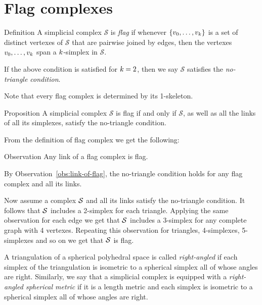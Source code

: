\section{Flag complexes}


\begin{thm}{Definition}
A simplicial complex $\mathcal{S}$ 
is \emph{flag} if whenever $\{v_0,\z\dots,v_\kay\}$
is a set of distinct vertexes of $\mathcal{S}$
that are pairwise joined by edges, then the vertexes $v_0,\dots,v_\kay$
span a $k$-simplex in $\mathcal{S}$.

If the above condition is satisfied for $k=2$, 
then we say $\mathcal{S}$ satisfies 
the \emph{no-triangle condition}.
\end{thm}

Note that every flag complex is determined by its 1-skeleton.

\begin{thm}{Proposition}\label{prop:no-trig}
A simplicial complex $\mathcal{S}$ is flag if and only if 
$\mathcal{S}$, as well as all the links of all its simplexes,
satisfy the no-triangle condition.
\end{thm}

From the definition of flag complex 
we get the following:

\begin{thm}{Observation}\label{obs:link-of-flag}
Any link of a flag complex is flag.
\end{thm}


By Observation~\ref{obs:link-of-flag}, the no-triangle condition holds 
for any flag complex and all its links.

Now assume a complex $\mathcal{S}$ and all its links satisfy 
the no-triangle condition.
It follows that $\mathcal{S}$ includes a 2-simplex for each triangle.
Applying the same observation for each edge we get that $\mathcal{S}$ 
includes a 3-simplex for any complete graph with 4 vertexes.
Repeating this observation 
for triangles, 
4-simplexes,
5-simplexes
and so on we get that $\mathcal{S}$ is flag.
\qeds


A triangulation of a spherical polyhedral space 
is called \emph{right-angled} 
if each simplex of the triangulation is isometric 
to a spherical simplex all of whose angles are right.
Similarly, we say that a simplicial complex 
is equipped with a \emph{right-angled spherical metric}
if it is a length metric and each simplex is isometric 
to a spherical simplex all of whose angles are right.

